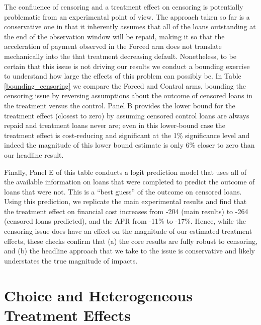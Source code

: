 \documentclass[ecta,nameyear,final]{econsocart}
\begin{document}
The confluence of censoring and a treatment effect on censoring is potentially problematic from an experimental point of view.  The approach taken so far is a conservative one in that it inherently assumes that all of the loans outstanding at the end of the observation window will be repaid, making it so that the acceleration of payment observed in the Forced arm does not translate mechanically into the that treatment decreasing default.  Nonetheless, to be certain that this issue is not driving our results we conduct a bounding exercise to understand how large the effects of this problem can possibly be.  In Table \ref{bounding_censoring} we compare the Forced and Control arms, bounding the censoring issue by reversing assumptions about the outcome of censored loans in the treatment versus the control.   Panel B provides the lower bound for the treatment effect (closest to zero) by assuming censored control loans are always repaid and treatment loans never are; even in this lower-bound case the treatment effect is cost-reducing and significant at the 1\% significance level and indeed the magnitude of this lower bound estimate is only 6\% closer to zero than our headline result.   

Finally, Panel E of this table conducts a logit prediction model that uses all of the available information on loans that were completed to predict the outcome of loans that were not.  This is a ``best guess'' of the outcome on censored loans.  Using this prediction, we replicate the main experimental results and find that the treatment effect on financial cost increases from -204 (main results) to -264 (censored loans predicted), and the APR from -11\% to -17\%.  Hence, while the censoring issue does have an effect on the magnitude of our estimated treatment effects, these  checks confirm that (a) the core results are fully robust to censoring, and (b) the headline approach that we take to the issue is conservative and likely understates the true magnitude of impacts.

\section{Choice and Heterogeneous Treatment Effects}
\label{Choice}
\end{document}
